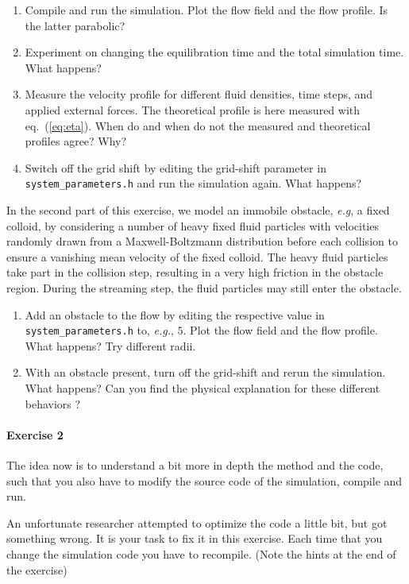 \documentclass[sizes,12pt,nftimes]{article}
\begin{document}
\begin{enumerate}
\item Compile and run the simulation. Plot the flow field and the flow
  profile. Is the latter parabolic?
\item Experiment on changing the equilibration time and the total
  simulation time. What happens?
\item Measure the velocity profile for different fluid densities, time
  steps, and applied external forces. The theoretical profile is here
  measured with eq.~(\ref{eq:eta}). When do and when do not the
  measured and theoretical profiles agree? Why?
\item Switch off the grid shift by editing the grid-shift parameter in
  \mbox{\texttt{system\_parameters.h}} and run the simulation
  again. What happens?
\end{enumerate}

In the second part of this exercise, we model an immobile obstacle, \emph{e.g}, a fixed colloid, by considering a number of heavy fixed fluid particles with velocities randomly drawn from a Maxwell-Boltzmann distribution before each collision to ensure a vanishing mean velocity of the fixed colloid. The heavy fluid particles take part in the collision step, resulting in a very high friction in the obstacle region. During the streaming step, the fluid particles may
still enter the obstacle.

\begin{enumerate} \addtocounter{enumi}{4}
\item Add an obstacle to the flow by editing the respective value in
  \mbox{\texttt{system\_parameters.h}} to, \emph{e.g.}, $5$. Plot the
  flow field and the flow profile. What happens?  Try different radii.
\item With an obstacle present, turn off the grid-shift and rerun the
  simulation. What happens? Can you find the physical explanation
  for these different behaviors ?
\end{enumerate}


\paragraph*{Exercise 2} The idea now is to understand a bit more in depth the
method and the code, such that you also have to modify the source code
of the simulation, compile and run. 
		
An unfortunate researcher attempted to optimize the code a little bit,
but got something wrong. It is your task to fix it in this
exercise. Each time that you change the simulation code you have to
recompile. (Note the hints at the end of the exercise)
		
\end{document}
